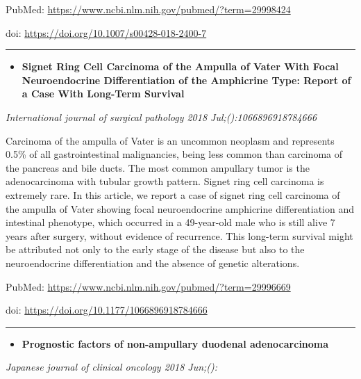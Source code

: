 \documentclass[]{article}
\providecommand{\tightlist}{%
  \setlength{\itemsep}{0pt}\setlength{\parskip}{0pt}}
\begin{document}
PubMed: \url{https://www.ncbi.nlm.nih.gov/pubmed/?term=29998424}

doi: \url{https://doi.org/10.1007/s00428-018-2400-7}

{}

{}

\begin{center}\rule{0.5\linewidth}{\linethickness}\end{center}

\begin{itemize}
\tightlist
\item
  \textbf{Signet Ring Cell Carcinoma of the Ampulla of Vater With Focal
  Neuroendocrine Differentiation of the Amphicrine Type: Report of a
  Case With Long-Term Survival}
\end{itemize}

\emph{International journal of surgical pathology 2018
Jul;():1066896918784666}

Carcinoma of the ampulla of Vater is an uncommon neoplasm and represents
0.5\% of all gastrointestinal malignancies, being less common than
carcinoma of the pancreas and bile ducts. The most common ampullary
tumor is the adenocarcinoma with tubular growth pattern. Signet ring
cell carcinoma is extremely rare. In this article, we report a case of
signet ring cell carcinoma of the ampulla of Vater showing focal
neuroendocrine amphicrine differentiation and intestinal phenotype,
which occurred in a 49-year-old male who is still alive 7 years after
surgery, without evidence of recurrence. This long-term survival might
be attributed not only to the early stage of the disease but also to the
neuroendocrine differentiation and the absence of genetic alterations.

PubMed: \url{https://www.ncbi.nlm.nih.gov/pubmed/?term=29996669}

doi: \url{https://doi.org/10.1177/1066896918784666}

{}

{}

\begin{center}\rule{0.5\linewidth}{\linethickness}\end{center}

\begin{itemize}
\tightlist
\item
  \textbf{Prognostic factors of non-ampullary duodenal adenocarcinoma}
\end{itemize}

\emph{Japanese journal of clinical oncology 2018 Jun;():}
\end{document}
